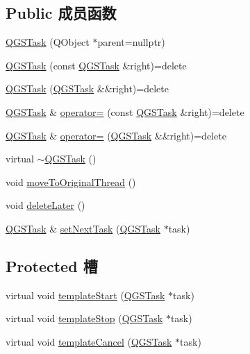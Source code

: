 \subsection*{Public 成员函数}
\begin{DoxyCompactItemize}
\item 
\mbox{\hyperlink{class_q_g_s_task_ad8978a85ac85919dda97d220fbae6fdd}{Q\+G\+S\+Task}} (Q\+Object $\ast$parent=nullptr)
\item 
\mbox{\hyperlink{class_q_g_s_task_a66d47ef0491bca7a61ada6169b476dd2}{Q\+G\+S\+Task}} (const \mbox{\hyperlink{class_q_g_s_task}{Q\+G\+S\+Task}} \&right)=delete
\item 
\mbox{\hyperlink{class_q_g_s_task_ac68bc758c3881a0b144cdeb22aaa5e84}{Q\+G\+S\+Task}} (\mbox{\hyperlink{class_q_g_s_task}{Q\+G\+S\+Task}} \&\&right)=delete
\item 
\mbox{\hyperlink{class_q_g_s_task}{Q\+G\+S\+Task}} \& \mbox{\hyperlink{class_q_g_s_task_a0ee95d2815f3dd2688bb8cbe33ee3bba}{operator=}} (const \mbox{\hyperlink{class_q_g_s_task}{Q\+G\+S\+Task}} \&right)=delete
\item 
\mbox{\hyperlink{class_q_g_s_task}{Q\+G\+S\+Task}} \& \mbox{\hyperlink{class_q_g_s_task_a63666786f1c09a76f511c4df86cd1d2a}{operator=}} (\mbox{\hyperlink{class_q_g_s_task}{Q\+G\+S\+Task}} \&\&right)=delete
\item 
virtual \mbox{\hyperlink{class_q_g_s_task_a42d36886fedb837970d95ceff73781b0}{$\sim$\+Q\+G\+S\+Task}} ()
\item 
void \mbox{\hyperlink{class_q_g_s_task_a42cb553217cbf0a1245d05fece653e71}{move\+To\+Original\+Thread}} ()
\item 
void \mbox{\hyperlink{class_q_g_s_task_abef97d47d8e7331208ea0e012c1a9d65}{delete\+Later}} ()
\item 
\mbox{\hyperlink{class_q_g_s_task}{Q\+G\+S\+Task}} \& \mbox{\hyperlink{class_q_g_s_task_af8a151adffe8b75daab58c6ec3f8b8eb}{set\+Next\+Task}} (\mbox{\hyperlink{class_q_g_s_task}{Q\+G\+S\+Task}} $\ast$task)
\end{DoxyCompactItemize}
\subsection*{Protected 槽}
\begin{DoxyCompactItemize}
\item 
virtual void \mbox{\hyperlink{class_q_g_s_task_af439bdb5171c97e8def24a5ff1c3a60e}{template\+Start}} (\mbox{\hyperlink{class_q_g_s_task}{Q\+G\+S\+Task}} $\ast$task)
\item 
virtual void \mbox{\hyperlink{class_q_g_s_task_a39a91ae9a508e3a2fda7a3334e2c6447}{template\+Stop}} (\mbox{\hyperlink{class_q_g_s_task}{Q\+G\+S\+Task}} $\ast$task)
\item 
virtual void \mbox{\hyperlink{class_q_g_s_task_ade5272b678776b00e47e2d88a2efa7c8}{template\+Cancel}} (\mbox{\hyperlink{class_q_g_s_task}{Q\+G\+S\+Task}} $\ast$task)
\end{DoxyCompactItemize}
